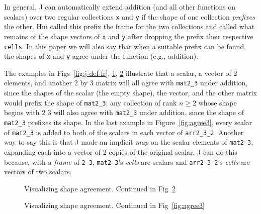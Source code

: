 In general, J can automatically extend addition (and all other functions on scalars) over two regular collections \texttt{x} and \texttt{y}
if the shape of one collection \textit{prefixes} the other.
Hui called this prefix the frame for the two collections 
and called what remains of the shape vectors of \texttt{x} and \texttt{y} 
after dropping the prefix their respective \texttt{cells}\cite{rankanduni}. 
In this paper we will also say that when a suitable prefix can be found, 
the shapes of \texttt{x} and \texttt{y} agree under the function (e.g., addition).

The examples in Figs~\ref{fig:j-def-fr}, \ref{fig:agree1}, \ref{fig:agree2} illustrate that 
a scalar, a vector of 2 elements, and another 2 by 3 matrix will all agree with \texttt{mat2\_3} under addition, 
since the shapes of the scalar (the empty shape), the vector, and the other matrix would prefix the shape of \texttt{mat2\_3}; 
any collection of rank $n \ge 2$ whose shape begins with $2$ $3$ will also agree with 
\texttt{mat2\_3} under addition, since the shape of \texttt{mat2\_3} prefixes its shape.
In the last example in Figure~\ref{fig:agree3}, 
every scalar of \texttt{mat2\_3} is added to both of the scalars in each vector of \texttt{arr2\_3\_2}. 
Another way to say this is that J made an implicit \textit{map} on the scalar elements of \texttt{mat2\_3}, 
expanding each into a vector of 2 copies of the original scalar.
J can do this because, with a \textit{frame} of \texttt{2 3}, \texttt{mat2\_3}'s \textit{cells} are scalars and 
\texttt{arr2\_3\_2}'s \textit{cells} are vectors of two scalars.


\begin{figure}[htbp]\ContinuedFloat*
\begin{quote}
\begin{singlespacing}
\begin{small}
\end{small}
\end{singlespacing}
\end{quote}
\caption{Visualizing shape agreement. Continued in Fig~\ref{fig:agree2}}
\label{fig:agree1}
\end{figure}

\begin{figure}[htbp]\ContinuedFloat
\begin{quote}
\begin{singlespacing}
\begin{small}
\end{small}
\end{singlespacing}
\end{quote}
\caption{Visualizing shape agreement. Continued in Fig~\ref{fig:agree3}}
\label{fig:agree2}
\end{figure}

